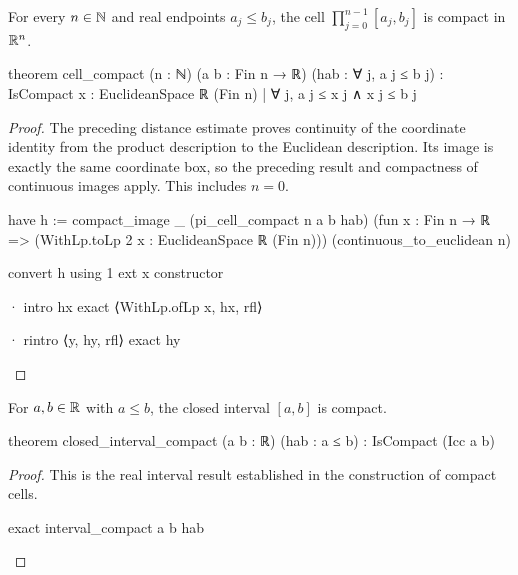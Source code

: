 \begin{theorem}
  \label{an1:thm:k-cell-is-compact}
  For every $n\in\mathbb{N}$ and real endpoints $a_j\leq b_j$, the cell $\prod_{j=0}^{n-1}[a_j,b_j]$ is
  compact in $\mathbb{R}^{n}$.

  \begin{lean}
    theorem cell_compact (n : ℕ) (a b : Fin n → ℝ) (hab : ∀ j, a j ≤ b j) :
        IsCompact {x : EuclideanSpace ℝ (Fin n) | ∀ j, a j ≤ x j ∧ x j ≤ b j}
  \end{lean}
\end{theorem}

\begin{proof}
  The preceding distance estimate proves continuity of the coordinate identity from the product
  description to the Euclidean description.
  Its image is exactly the same coordinate box, so the preceding result and compactness of
  continuous images apply.
  This includes $n=0$.

  \begin{lean}
    have h := compact_image _ (pi_cell_compact n a b hab)
      (fun x : Fin n → ℝ => (WithLp.toLp 2 x : EuclideanSpace ℝ (Fin n)))
      (continuous_to_euclidean n)

    convert h using 1
    ext x
    constructor

    · intro hx
      exact ⟨WithLp.ofLp x, hx, rfl⟩

    · rintro ⟨y, hy, rfl⟩
      exact hy
  \end{lean}

\end{proof}

\begin{corollary}
  \label{an1:cor:closed-interval-in-R-is-compact}
  For $a,b\in\mathbb{R}$ with $a\leq b$, the closed interval $[a,b]$ is compact.

  \begin{lean}
    theorem closed_interval_compact (a b : ℝ) (hab : a ≤ b) : IsCompact (Icc a b)
  \end{lean}
\end{corollary}

\begin{proof}
  This is the real interval result established in the construction of compact cells.

  \begin{lean}
    exact interval_compact a b hab
  \end{lean}

\end{proof}

